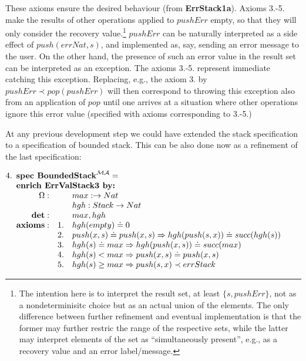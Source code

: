 \documentclass[10pt]{article}
\begin{document}
\noindent
These axioms ensure the desired behaviour (from {\bf
ErrStack1a}).  Axioms 3.-5. make the results of other operations applied to
$pushErr$ empty, so that they will only consider the recovery
value.\footnote{The intention here is to interpret the result set, at least $\{s,pushErr\}$, not as
a nondeterminisitc choice but as an actual union of the elements.
The only difference between
further refinement and eventual implementation is that the
former may further restric the range of the respective sets, while the latter
may interpret elements of the set as ``simultaneously present'', e.g., as a
recovery value and an error label/message.}
$pushErr$ can be naturally interpreted as a side effect of
$push(errNat,s)$, and implemented as, say, sending an error
message to the user. On the other hand, the presence of such an error value
in the result set can be interpreted as an exception. The axioms
3.-5. represent immediate catching this exception. Replacing, e.g., the
axiom 3. by $pushErr \prec pop(pushErr)$ will then correspond to throwing
this exception also from an application of $pop$ until one arrives at a
situation where other operations ignore this error value (specified with
axioms corresponding to 3.-5.)

At any previous development step we could have extended the stack
specification to a specification of bounded stack. This can be also done now
as a refinement of the last specification: %

\(
4. \spec{	\tit{\mbox{\bf spec\ BoundedStack}^{\inst{MA}}=} \\
	\tit{\mbox{\bf enrich\ ErrValStack3\  by:}} \\
	    	\Ops:	&& max: \to Nat\\
		        && hgh: Stack \to Nat \\
		{\bf det:} && max, hgh \\
	 	{\bf axioms:}
			&1.& hgh(empty) \eleq 0 \\
			&2.& push(x,s)\eleq push(x,s) \To hgh(push(s,x))\eleq
			succ(hgh(s)) \\
			&3.& hgh(s)\eleq max \To hgh(push(x,s))\eleq
			succ(max) \\
			&4.& hgh(s)<max \To push(x,s)\eleq push(x,s) \\
			&5.& hgh(s)\geq max \To push(s,x)\prec errStack
}
\)
\end{document}
